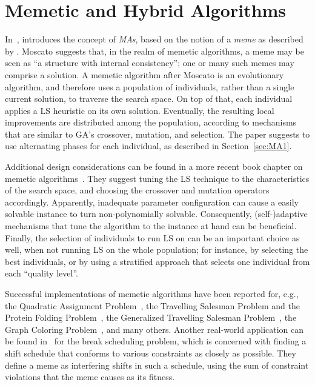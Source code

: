 \documentclass[thesis.tex]{subfiles}
\begin{document}
\section{Memetic and Hybrid Algorithms}
   \label{related:moscato}
%
In~\parencite{moscato-1989}, \citeauthor{moscato-1989} introduces the concept of \emph{\glsdesc{MA}s}, based on the notion of a \emph{meme} as described by \textcite{dawkins-1976-theSelfishGene}. Moscato suggests that, in the realm of memetic algorithms, a meme may be seen as \enquote{a structure with internal consistency}; one or many such memes may comprise a solution. A memetic algorithm after Moscato is an evolutionary algorithm, and therefore uses a population of individuals, rather than a single current solution, to traverse the search space. On top of that, each individual applies a \gls{LS} heuristic on its own solution. Eventually, the resulting local improvements are distributed among the population, according to mechanisms that are similar to \gls{GA}'s crossover, mutation, and selection. The paper suggests to use alternating phases for each individual, as described in Section~\vref{sec:MA1}.

Additional design considerations can be found in a more recent book chapter on memetic algorithms~\cite{moscato-2010-modernMAs}. They suggest tuning the \gls{LS} technique to the characteristics of the search space, and choosing the crossover and mutation operators accordingly. Apparently, inadequate parameter configuration can cause a easily solvable instance to turn non-polynomially solvable. Consequently, (self-)adaptive mechanisms that tune the algorithm to the instance at hand can be beneficial. Finally, the selection of individuals to run \gls{LS} on can be an important choice as well, when not running \gls{LS} on the whole population; for instance, by selecting the best individuals, or by using a stratified approach that selects one individual from each \enquote{quality level}.

Successful implementations of memetic algorithms have been reported for, e.g., the Quadratic Assignment Problem~\parencite{785529}, the Travelling Salesman Problem and the Protein Folding Problem~\parencite{krasnogor2000memetic}, the Generalized Travelling Salesman Problem~\parencite{Bontoux20101844}, the Graph Coloring Problem~\parencite{Lü2010241,galinier98hybrid}, and many others. Another real-world application can be found in~\parencite{widl-thesis,widl-paper} for the break scheduling problem, which is concerned with finding a shift schedule that conforms to various constraints as closely as possible. They define a meme as interfering shifts in such a schedule, using the sum of constraint violations that the meme causes as its fitness.
\end{document}
